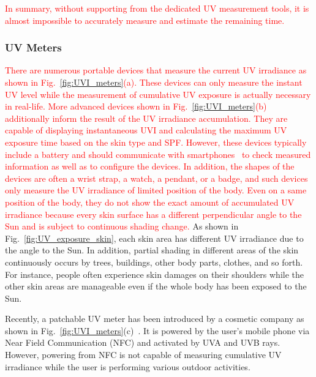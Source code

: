 \documentclass[journal]{IEEEtran}
\begin{document}
\textcolor{red}{In summary, without supporting from the dedicated UV measurement tools, it is almost impossible to accurately measure and estimate the remaining time.}


\subsubsection{UV Meters}
\textcolor{red}{There are numerous portable devices that measure the current UV irradiance as shown in Fig.~\ref{fig:UVI_meters}(a).
These devices can only measure the instant UV level while the measurement of cumulative UV exposure is actually necessary in real-life. More advanced devices shown in Fig.~\ref{fig:UVI_meters}(b) additionally inform the result of the UV irradiance accumulation. They are capable of displaying instantaneous UVI and calculating the maximum UV exposure time based on the skin type and SPF.
However, these devices typically include a battery and should communicate with smartphones~\cite{Netatmo, Ultra} to check measured information as well as to configure the devices. In addition, the shapes of the devices are often a wrist strap, a watch, a pendant, or a badge, and such devices only measure the UV irradiance of limited position of the body. Even on a same position of the body, they do not show the exact amount of accumulated UV irradiance because every skin surface has a different perpendicular angle to the Sun and is subject to continuous shading change.}
%
As shown in Fig.~\ref{fig:UV_exposure_skin}, each skin area has different UV irradiance due to the angle to the Sun.
In addition, partial shading in different areas of the skin continuously occurs by trees, buildings, other body parts, clothes, and so forth. For instance, people often experience skin damages on their shoulders while the other skin areas are manageable even if the whole body has been exposed to the Sun.

Recently, a patchable UV meter has been introduced by a cosmetic company as shown in Fig.~\ref{fig:UVI_meters}(c)~\cite{LOreal}. It is powered by the user's mobile phone via Near Field Communication (NFC) and activated by UVA and UVB rays. However, powering from NFC is not capable of measuring cumulative UV irradiance while the user is performing various outdoor activities.
\end{document}
